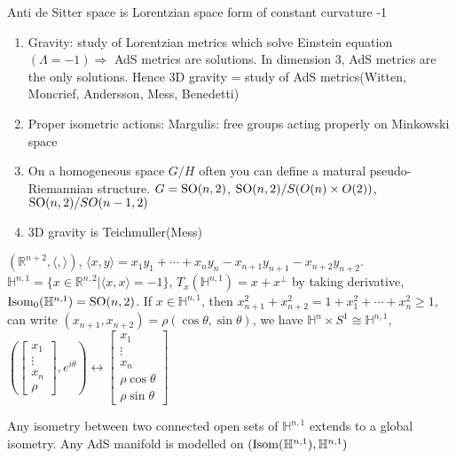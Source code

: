 \documentclass[main]{subfiles}
\begin{document}
\begin{definition}
Anti de Sitter space is Lorentzian space form of constant curvature -1
\end{definition}

\begin{motivation} \hfill
\begin{enumerate}[leftmargin=*]
\item Gravity: study of Lorentzian metrics which solve Einstein equation $(\Lambda=-1)\Rightarrow$ AdS metrics are solutions. In dimension 3, AdS metrics are the only solutions. Hence 3D gravity = study of AdS metrics(Witten, Moncrief, Andersson, Mess, Benedetti)
\item Proper isometric actions: Margulis: free groups acting properly on Minkowski space
\item On a homogeneous space $G/H$ often you can define a matural pseudo-Riemannian structure. $G=\operatorname{SO}(n,2)$, $\operatorname{SO}(n,2)/S(O(n)\times O(2))$, $\operatorname{SO}(n,2)/SO(n-1,2)$
\item 3D gravity is Teichmuller(Mess)
\end{enumerate}
\end{motivation}

\begin{definition}
$(\mathbb R^{n+2},\langle,\rangle)$, $\langle x,y\rangle=x_1y_1+\cdots+x_ny_n-x_{n+1}y_{n+1}-x_{n+2}y_{n+2}$. $\mathbb H^{n,1}=\{x\in\mathbb R^{n,2}|\langle x,x\rangle=-1\}$, $T_x(\mathbb H^{n,1})=x+x^\perp$ by taking derivative, $\operatorname{Isom}_0(\mathbb H^{n,1})=\operatorname{SO}(n,2)$. If $x\in\mathbb H^{n,1}$, then $x_{n+1}^2+x_{n+2}^2=1+x_1^2+\cdots+x_n^2\geq1$, can write $(x_{n+1},x_{n+2})=\rho(\cos\theta,\sin\theta)$, we have $\mathbb H^n\times S^1\cong\mathbb H^{n,1}$, $\left(\begin{bmatrix}
x_1\\
\vdots\\
x_n\\
\rho
\end{bmatrix},e^{i\theta}\right)\leftrightarrow\begin{bmatrix}
x_1\\
\vdots\\
x_n\\
\rho\cos\theta\\
\rho\sin\theta
\end{bmatrix}$
\end{definition}

\begin{fact}
Any isometry between two connected open sets of $\mathbb H^{n,1}$ extends to a global isometry. Any AdS manifold is modelled on $(\operatorname{Isom}(\mathbb H^{n,1}),\mathbb H^{n,1})$
\end{fact}
\end{document}
